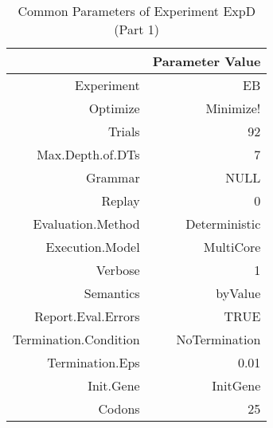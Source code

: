 \begin{table}[ht]
\centering
\begin{tabular}{rr}
  \hline
 & Parameter Value \\ 
  \hline
Experiment & EB \\ 
  Optimize & Minimize! \\ 
  Trials & 92 \\ 
  Max.Depth.of.DTs & 7 \\ 
  Grammar & NULL \\ 
  Replay & 0 \\ 
  Evaluation.Method & Deterministic \\ 
  Execution.Model & MultiCore \\ 
  Verbose & 1 \\ 
  Semantics & byValue \\ 
  Report.Eval.Errors & TRUE \\ 
  Termination.Condition & NoTermination \\ 
  Termination.Eps & 0.01 \\ 
  Init.Gene & InitGene \\ 
  Codons & 25 \\ 
   \hline
\end{tabular}
\caption{Common Parameters of Experiment ExpD (Part 1)} 
\end{table}
